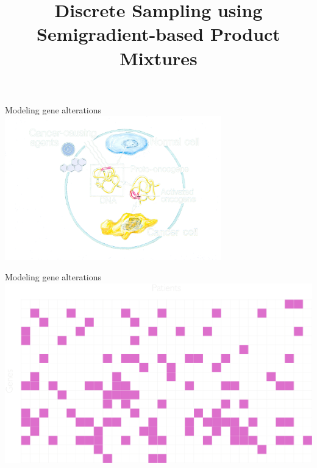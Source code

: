 \documentclass[mathserif]{beamer}
\title[Discrete Sampling using Semigradient-based Product Mixtures]
{Discrete Sampling using Semigradient-based Product Mixtures}
\author[Alkis Gotovos]{}
\begin{document}


\begin{frame}{Modeling gene alterations}
\includegraphics[width=3.7in]{figures/oncogene.png}\\
\end{frame}

\begin{frame}{Modeling gene alterations}
\centering
\includegraphics[width=\textwidth]{figures/grid_genes.pdf}
\end{frame}
\end{document}
